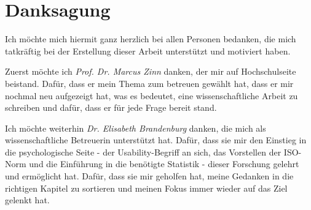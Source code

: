 

\bigskip

\begingroup
\let\clearpage\relax
\let\cleardoublepage\relax
\let\cleardoublepage\relax
\chapter*{Danksagung}


Ich möchte mich hiermit ganz herzlich bei allen Personen bedanken, die mich tatkräftig bei der Erstellung dieser Arbeit unterstützt und motiviert haben.


Zuerst möchte ich \textit{Prof. Dr. Marcus Zinn} danken, der mir %
auf Hochschulseite beistand. Dafür, dass er mein Thema zum betreuen gewählt hat, dass er mir nochmal neu aufgezeigt hat, was es bedeutet, eine wissenschaftliche Arbeit zu schreiben und dafür, dass er für jede Frage bereit stand.

Ich möchte weiterhin \textit{Dr. Elisabeth Brandenburg} danken, die mich als wissenschaftliche Betreuerin unterstützt hat. Dafür, dass sie mir den Einstieg in die psychologische Seite - der Usability-Begriff an sich, das Vorstellen der ISO-Norm und die Einführung in die benötigte Statistik - dieser Forschung gelehrt und ermöglicht hat. Dafür, dass sie mir geholfen hat, meine Gedanken in die richtigen Kapitel zu sortieren und meinen Fokus immer wieder auf das Ziel gelenkt hat.

